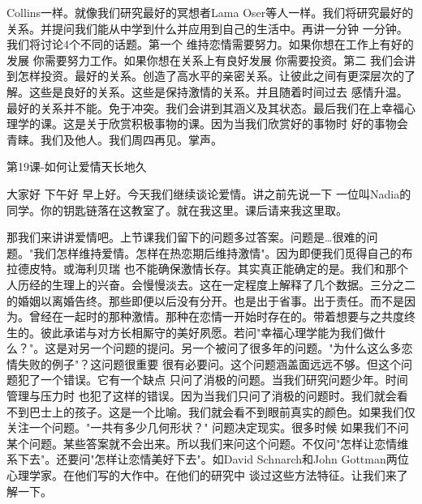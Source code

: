 Collins一样。就像我们研究最好的冥想者Lama Oser等人一样。我们将研究最好的关系。并提问我们能从中学到什么并应用到自己的生活中。再讲一分钟 一分钟。我们将讨论4个不同的话题。第一个 维持恋情需要努力。如果你想在工作上有好的发展 你需要努力工作。如果你想在关系上有良好发展 你需要投资。第二 我们会讲到怎样投资。最好的关系。创造了高水平的亲密关系。让彼此之间有更深层次的了解。这些是良好的关系。这些是保持激情的关系。并且随着时间过去 感情升温。最好的关系并不能。免于冲突。我们会讲到其涵义及其状态。最后我们在上幸福心理学的课。这是关于欣赏积极事物的课。因为当我们欣赏好的事物时 好的事物会青睐。我们及他人。我们周四再见。掌声。 

第19课-如何让爱情天长地久 

大家好 下午好 早上好。今天我们继续谈论爱情。讲之前先说一下 一位叫Nadia的同学。你的钥匙链落在这教室了。就在我这里。课后请来我这里取。 

那我们来讲讲爱情吧。上节课我们留下的问题多过答案。问题是…很难的问题。"我们怎样维持爱情。怎样在热恋期后维持激情"。因为即便我们觅得自己的布拉德皮特。或海利贝瑞 也不能确保激情长存。其实真正能确定的是。我们和那个人历经的生理上的兴奋。会慢慢淡去。这在一定程度上解释了几个数据。三分之二的婚姻以离婚告终。那些即便以后没有分开。也是出于省事。出于责任。而不是因为。曾经在一起时的那种激情。那种在恋情一开始时存在的。带着想要与之共度终生的。彼此承诺与对方长相厮守的美好夙愿。若问"幸福心理学能为我们做什么？"。这是对另一个问题的提问。另一个被问了很多年的问题。"为什么这么多恋情失败的例子"？这问题很重要 很有必要问。这个问题涵盖面远远不够。但这个问题犯了一个错误。它有一个缺点 只问了消极的问题。当我们研究问题少年。时间管理与压力时 也犯了这样的错误。因为当我们只问了消极的问题时。我们就会看不到巴士上的孩子。这是一个比喻。我们就会看不到眼前真实的颜色。如果我们仅关注一个问题。"一共有多少几何形状？" 问题决定现实。很多时候 如果我们不问某个问题。某些答案就不会出来。所以我们来问这个问题。不仅问"怎样让恋情维系下去"。还要问"怎样让恋情美好下去"。如David Schnarch和John Gottman两位心理学家。在他们写的大作中。在他们的研究中 谈过这些方法特征。让我们来了解一下。 

